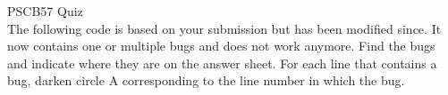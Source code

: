 \documentclass{article}
\begin{document}
\noindent
{\huge PSCB57 Quiz}\\[1pt]

\noindent
The following code is based on your submission but has been modified since.
It now contains one or multiple bugs and does not work anymore.
Find the bugs and indicate where they are on the answer sheet.
For each line that contains a bug, darken circle A corresponding to the line number in which the bug. 
 

\end{document}

